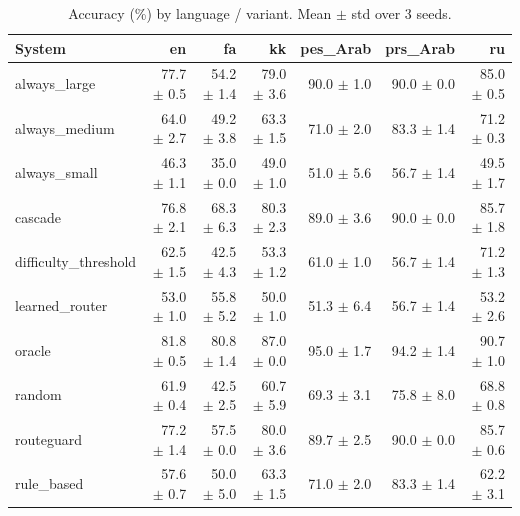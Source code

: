 \begin{table}[t]
\centering
\small
\caption{Accuracy (\%) by language / variant. Mean $\pm$ std over 3 seeds.}
\label{tab:language_breakdown}
\begin{tabular}{lrrrrrr}
\toprule
System & en & fa & kk & pes\_Arab & prs\_Arab & ru \\
\midrule
always\_large & 77.7 $\pm$ 0.5 & 54.2 $\pm$ 1.4 & 79.0 $\pm$ 3.6 & 90.0 $\pm$ 1.0 & 90.0 $\pm$ 0.0 & 85.0 $\pm$ 0.5 \\
always\_medium & 64.0 $\pm$ 2.7 & 49.2 $\pm$ 3.8 & 63.3 $\pm$ 1.5 & 71.0 $\pm$ 2.0 & 83.3 $\pm$ 1.4 & 71.2 $\pm$ 0.3 \\
always\_small & 46.3 $\pm$ 1.1 & 35.0 $\pm$ 0.0 & 49.0 $\pm$ 1.0 & 51.0 $\pm$ 5.6 & 56.7 $\pm$ 1.4 & 49.5 $\pm$ 1.7 \\
cascade & 76.8 $\pm$ 2.1 & 68.3 $\pm$ 6.3 & 80.3 $\pm$ 2.3 & 89.0 $\pm$ 3.6 & 90.0 $\pm$ 0.0 & 85.7 $\pm$ 1.8 \\
difficulty\_threshold & 62.5 $\pm$ 1.5 & 42.5 $\pm$ 4.3 & 53.3 $\pm$ 1.2 & 61.0 $\pm$ 1.0 & 56.7 $\pm$ 1.4 & 71.2 $\pm$ 1.3 \\
learned\_router & 53.0 $\pm$ 1.0 & 55.8 $\pm$ 5.2 & 50.0 $\pm$ 1.0 & 51.3 $\pm$ 6.4 & 56.7 $\pm$ 1.4 & 53.2 $\pm$ 2.6 \\
oracle & 81.8 $\pm$ 0.5 & 80.8 $\pm$ 1.4 & 87.0 $\pm$ 0.0 & 95.0 $\pm$ 1.7 & 94.2 $\pm$ 1.4 & 90.7 $\pm$ 1.0 \\
random & 61.9 $\pm$ 0.4 & 42.5 $\pm$ 2.5 & 60.7 $\pm$ 5.9 & 69.3 $\pm$ 3.1 & 75.8 $\pm$ 8.0 & 68.8 $\pm$ 0.8 \\
routeguard & 77.2 $\pm$ 1.4 & 57.5 $\pm$ 0.0 & 80.0 $\pm$ 3.6 & 89.7 $\pm$ 2.5 & 90.0 $\pm$ 0.0 & 85.7 $\pm$ 0.6 \\
rule\_based & 57.6 $\pm$ 0.7 & 50.0 $\pm$ 5.0 & 63.3 $\pm$ 1.5 & 71.0 $\pm$ 2.0 & 83.3 $\pm$ 1.4 & 62.2 $\pm$ 3.1 \\
\bottomrule
\end{tabular}
\end{table}
